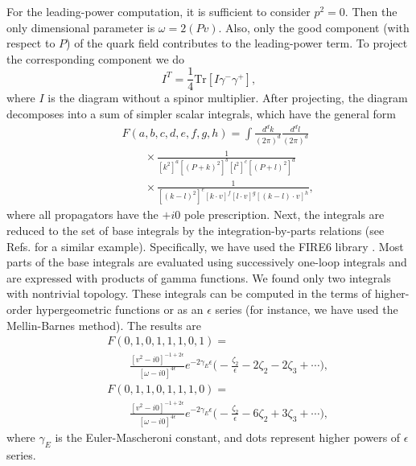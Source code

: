 \documentclass[aps,prl,twocolumn,secnumarabic,notitlepage,superscriptaddress,nofootinbib,tightenlines,floatfix,preprintnumbers]{revtex4-1}
\newcommand{\nn}{\nonumber}
\renewcommand{\(}{\left(}
\renewcommand{\)}{\right)}
\renewcommand{\[}{\left[}
\renewcommand{\]}{\right]}
\begin{document}
For the leading-power computation, it is sufficient to consider $p^2=0$. Then the only dimensional parameter is $\omega=2(Pv)$. Also, only the good component (with respect to $P$) of the quark field contributes to the leading-power term. To project the corresponding component we do
\begin{equation}\label{Trace}
I^T=\frac{1}{4}\text{Tr}\left[I\gamma^-\gamma^+\right],
\end{equation}
where $I$ is the diagram without a spinor multiplier. After projecting, the diagram decomposes into a sum of simpler scalar integrals, which have the general form
\begin{eqnarray}
&& F(a,b,c,d,e,f,g,h)=\int \frac{d^dk}{(2\pi)^d}\frac{d^dl}{(2\pi)^d}
\\\nn &&\qquad \times \frac{1}{[k^2]^a[(P+k)^2]^b[l^2]^c[(P+l)^2]^d}
\\\nn &&\qquad \times\frac{1}{[(k-l)^2]^e[k\cdot v]^f[l\cdot v]^g[(k-l)\cdot v]^h},
\end{eqnarray}
where all propagators have the $+i0$ pole prescription. Next, the integrals are reduced to the set of base integrals by the integration-by-parts relations (see Refs.\cite{Broadhurst:1994se,Chetyrkin:2003vi} for a similar example). Specifically, we have used the FIRE6 library \cite{Smirnov:2019qkx}. Most parts of the base integrals are evaluated using successively one-loop integrals and are expressed with products of gamma functions. We found only two integrals with nontrivial topology. These integrals can be computed in the terms of higher-order hypergeometric functions or as an $\epsilon$ series \cite{Smirnov:2012gma} (for instance, we have used the Mellin-Barnes method). The results are
\begin{eqnarray}
&&F(0,1,0,1,1,1,0,1)=
\\\nn &&
\qquad
\frac{[v^2-i0]^{-1+2\epsilon}}{[\omega-i0]^{4\epsilon}}e^{-2\gamma_E\epsilon}
\Big(
 -\frac{\zeta_2}{\epsilon}-2\zeta_2-2\zeta_3+\cdots\Big),
\\
&& F(0,1,1,0,1,1,1,0)=
\\\nn &&
\qquad
\frac{[v^2-i0]^{-1+2\epsilon}}{[\omega-i0]^{4\epsilon}}e^{-2\gamma_E\epsilon}
\Big(
 -\frac{\zeta_2}{\epsilon}-6\zeta_2+3\zeta_3+\cdots\Big),
\end{eqnarray}
where $\gamma_E$ is the Euler-Mascheroni constant, and dots represent higher powers of $\epsilon$ series. 
\end{document}
